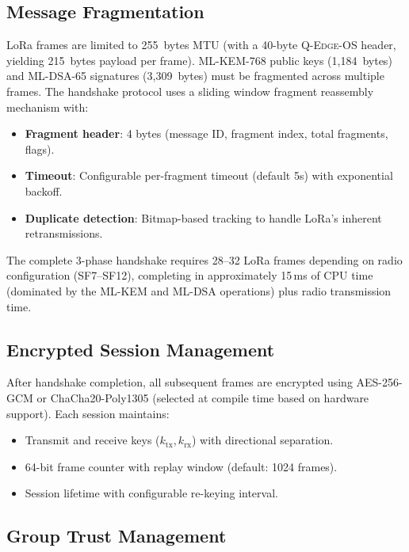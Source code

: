 \documentclass[conference,10pt]{IEEEtran}
\newcommand{\system}{\textsc{Q-Edge-OS}}
\begin{document}
\subsection{Message Fragmentation}

LoRa frames are limited to 255~bytes MTU (with a 40-byte \system{} header, yielding 215~bytes payload per frame). ML-KEM-768 public keys (1,184~bytes) and ML-DSA-65 signatures (3,309~bytes) must be fragmented across multiple frames. The handshake protocol uses a sliding window fragment reassembly mechanism with:

\begin{itemize}[leftmargin=*]
  \item \textbf{Fragment header}: 4 bytes (message ID, fragment index, total fragments, flags).
  \item \textbf{Timeout}: Configurable per-fragment timeout (default 5s) with exponential backoff.
  \item \textbf{Duplicate detection}: Bitmap-based tracking to handle LoRa's inherent retransmissions.
\end{itemize}

The complete 3-phase handshake requires 28--32 LoRa frames depending on radio configuration (SF7--SF12), completing in approximately 15\,ms of CPU time (dominated by the ML-KEM and ML-DSA operations) plus radio transmission time.

\subsection{Encrypted Session Management}

After handshake completion, all subsequent frames are encrypted using AES-256-GCM or ChaCha20-Poly1305 (selected at compile time based on hardware support). Each session maintains:

\begin{itemize}[leftmargin=*]
  \item Transmit and receive keys ($k_{\text{tx}}, k_{\text{rx}}$) with directional separation.
  \item 64-bit frame counter with replay window (default: 1024 frames).
  \item Session lifetime with configurable re-keying interval.
\end{itemize}

\subsection{Group Trust Management}
\end{document}
